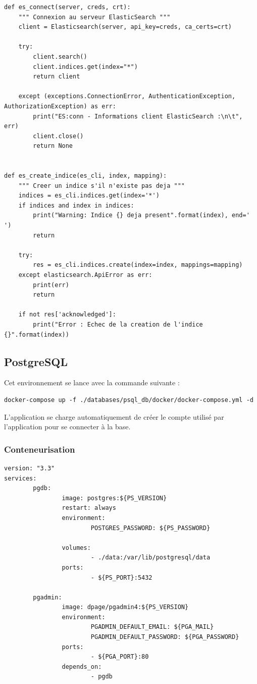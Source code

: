 \documentclass[a4paper,12pt]{article}
\begin{document}
			
				\begin{lstlisting}[title=Fonctions utiles]
def es_connect(server, creds, crt):
    """ Connexion au serveur ElasticSearch """
    client = Elasticsearch(server, api_key=creds, ca_certs=crt)

    try:
        client.search()
        client.indices.get(index="*")
        return client

    except (exceptions.ConnectionError, AuthenticationException, AuthorizationException) as err:
        print("ES:conn - Informations client ElasticSearch :\n\t", err)
        client.close()
        return None


def es_create_indice(es_cli, index, mapping):
    """ Creer un indice s'il n'existe pas deja """
    indices = es_cli.indices.get(index='*')
    if indices and index in indices:
        print("Warning: Indice {} deja present".format(index), end=' ')
        return

    try:
        res = es_cli.indices.create(index=index, mappings=mapping)
    except elasticsearch.ApiError as err:
        print(err)
        return

    if not res['acknowledged']:
        print("Error : Echec de la creation de l'indice {}".format(index))
				\end{lstlisting}
				


	\subsection{PostgreSQL} \label{PSQL}
		Cet environnement se lance avec la commande suivante :
		\begin{verbatim}
docker-compose up -f ./databases/psql_db/docker/docker-compose.yml -d		
		\end{verbatim}
		
		L'application se charge automatiquement de créer le compte utilisé par l'application pour se connecter à la base.
				
		\subsubsection{Conteneurisation}
			\begin{lstlisting}[title=DockerCompose]
version: "3.3"
services:
        pgdb:
                image: postgres:${PS_VERSION}
                restart: always
                environment:
                        POSTGRES_PASSWORD: ${PS_PASSWORD}

                volumes:
                        - ./data:/var/lib/postgresql/data
                ports:
                        - ${PS_PORT}:5432

        pgadmin:
                image: dpage/pgadmin4:${PS_VERSION}
                environment:
                        PGADMIN_DEFAULT_EMAIL: ${PGA_MAIL}
                        PGADMIN_DEFAULT_PASSWORD: ${PGA_PASSWORD}
                ports:
                        - ${PGA_PORT}:80
                depends_on:
                        - pgdb
			\end{lstlisting}
			
\end{document}
